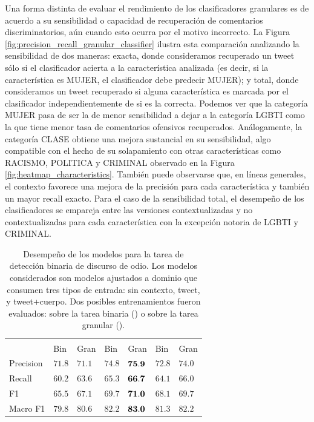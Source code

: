 Una forma distinta de evaluar el rendimiento de los clasificadores granulares es de acuerdo a su sensibilidad o capacidad de recuperación de comentarios discriminatorios, aún cuando esto ocurra por el motivo incorrecto. La Figura \ref{fig:precision_recall_granular_classifier} ilustra esta comparación analizando la sensibilidad de dos maneras: exacta, donde consideramos recuperado un tweet sólo si el clasificador acierta a la característica analizada (es decir, si la característica es MUJER, el clasificador debe predecir MUJER); y total, donde consideramos un tweet recuperado si alguna característica es marcada por el clasificador independientemente de si es la correcta. Podemos ver que la categoría MUJER pasa de ser la de menor sensibilidad a dejar a la categoría LGBTI como la que tiene menor tasa de comentarios ofensivos recuperados. Análogamente, la categoría CLASE obtiene una mejora sustancial en su sensibilidad, algo compatible con el hecho de su solapamiento con otras características como RACISMO, POLITICA y CRIMINAL observado en la Figura \ref{fig:heatmap_characteristics}. También puede observarse que, en líneas generales, el contexto favorece una mejora de la precisión para cada característica y también un mayor recall exacto. Para el caso de la sensibilidad total, el desempeño de los clasificadores se empareja entre las versiones contextualizadas y no contextualizadas para cada característica con la excepción notoria de LGBTI y CRIMINAL.

\begin{table}[hb!]
    \centering
    \begin{tabular}{l P{0.10\textwidth}P{0.10\textwidth} P{0.10\textwidth}P{0.10\textwidth}  P{0.10\textwidth}P{0.10\textwidth}}
                  &&           &      \\
                  & Bin   &    Gran         & Bin   &    Gran     & Bin  &   Gran     \\
        \hline
        Precision &  $71.8$ &  $71.1$       &  $74.8$& $\mathbf{75.9}$ & $72.8$ & $74.0$ \\
        Recall    &  $60.2$ &  $63.6$       &  $65.3$& $\mathbf{66.7}$ & $64.1$ & $66.0$ \\
        F1        &  $65.5$ &  $67.1$       &  $69.7$& $\mathbf{71.0}$ & $68.1$ & $69.7$ \\
        Macro F1  &  $79.8$ &  $80.6$       &  $82.2$& $\mathbf{83.0}$ & $81.3$ & $82.2$ \\
        \hline
        \end{tabular}
    \caption{Desempeño de los modelos para la tarea de detección binaria de discurso de odio. Los modelos considerados son modelos \beto{} ajustados a dominio que consumen tres tipos de entrada: sin contexto, tweet, y tweet+cuerpo. Dos posibles entrenamientos fueron evaluados: sobre la tarea binaria () o sobre la tarea granular ().}
    \label{tab:plain_vs_granular_hate_detection}
\end{table}


